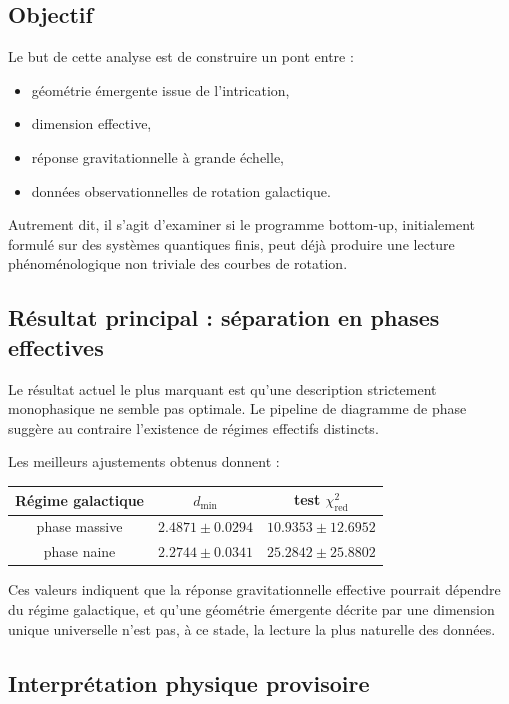 \documentclass[11pt]{article}
\begin{document}
\subsection{Objectif}

Le but de cette analyse est de construire un pont entre :

\begin{itemize}
\item géométrie émergente issue de l'intrication,
\item dimension effective,
\item réponse gravitationnelle à grande échelle,
\item données observationnelles de rotation galactique.
\end{itemize}

Autrement dit, il s'agit d'examiner si le programme bottom-up, initialement formulé sur des systèmes quantiques finis, peut déjà produire une lecture phénoménologique non triviale des courbes de rotation.

\subsection{Résultat principal : séparation en phases effectives}

Le résultat actuel le plus marquant est qu'une description strictement monophasique ne semble pas optimale. Le pipeline de diagramme de phase suggère au contraire l'existence de régimes effectifs distincts.

Les meilleurs ajustements obtenus donnent :

\begin{center}
\begin{tabular}{ccc}
\toprule
Régime galactique & $d_{\min}$ & test $\chi^2_{\mathrm{red}}$ \\
\midrule
phase massive & $2.4871 \pm 0.0294$ & $10.9353 \pm 12.6952$ \\
phase naine & $2.2744 \pm 0.0341$ & $25.2842 \pm 25.8802$ \\
\bottomrule
\end{tabular}
\end{center}

Ces valeurs indiquent que la réponse gravitationnelle effective pourrait dépendre du régime galactique, et qu'une géométrie émergente décrite par une dimension unique universelle n'est pas, à ce stade, la lecture la plus naturelle des données.

\subsection{Interprétation physique provisoire}
\end{document}
